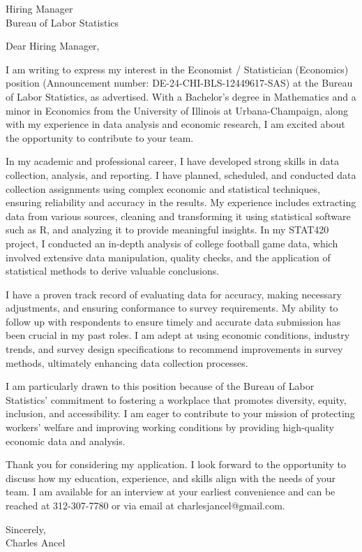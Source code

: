 \documentclass{letter}
\begin{document}
\begin{letter}{Hiring Manager\\Bureau of Labor Statistics\\}

\opening{Dear Hiring Manager,}

I am writing to express my interest in the Economist / Statistician (Economics) position (Announcement number: DE-24-CHI-BLS-12449617-SAS) at the Bureau of Labor Statistics, as advertised. With a Bachelor's degree in Mathematics and a minor in Economics from the University of Illinois at Urbana-Champaign, along with my experience in data analysis and economic research, I am excited about the opportunity to contribute to your team.

In my academic and professional career, I have developed strong skills in data collection, analysis, and reporting. I have planned, scheduled, and conducted data collection assignments using complex economic and statistical techniques, ensuring reliability and accuracy in the results. My experience includes extracting data from various sources, cleaning and transforming it using statistical software such as R, and analyzing it to provide meaningful insights. In my STAT420 project, I conducted an in-depth analysis of college football game data, which involved extensive data manipulation, quality checks, and the application of statistical methods to derive valuable conclusions.

I have a proven track record of evaluating data for accuracy, making necessary adjustments, and ensuring conformance to survey requirements. My ability to follow up with respondents to ensure timely and accurate data submission has been crucial in my past roles. I am adept at using economic conditions, industry trends, and survey design specifications to recommend improvements in survey methods, ultimately enhancing data collection processes.

I am particularly drawn to this position because of the Bureau of Labor Statistics' commitment to fostering a workplace that promotes diversity, equity, inclusion, and accessibility. I am eager to contribute to your mission of protecting workers' welfare and improving working conditions by providing high-quality economic data and analysis.

Thank you for considering my application. I look forward to the opportunity to discuss how my education, experience, and skills align with the needs of your team. I am available for an interview at your earliest convenience and can be reached at 312-307-7780 or via email at charlesjancel@gmail.com.

\begin{flushleft}
Sincerely,\\
Charles Ancel
\end{flushleft}

\end{letter}
\end{document}
